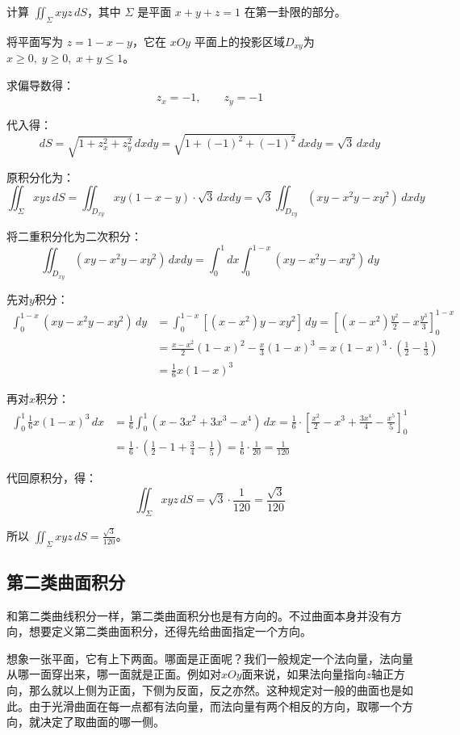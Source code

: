 \begin{myexample}
计算 \(\iint_{\Sigma} xyz \, dS\)，其中 \(\Sigma\) 是平面 \(x+y+z=1\) 在第一卦限的部分。

将平面写为 \(z=1-x-y\)，它在 \(xOy\) 平面上的投影区域\(D_{xy}\)为\(x\ge 0,\;y\ge 0,\;x+y\le 1\)。

求偏导数得：
\[
z_x = -1,\qquad z_y = -1
\]

代入得：
\[
dS = \sqrt{1+z_x^2+z_y^2}\,dxdy
= \sqrt{1+(-1)^2+(-1)^2}\,dxdy
= \sqrt{3}\,dxdy
\]

原积分化为：
\[
\iint_{\Sigma} xyz \, dS
= \iint_{D_{xy}} xy(1-x-y) \cdot \sqrt{3}\,dxdy
= \sqrt{3} \iint_{D_{xy}} (xy - x^2y - xy^2)\,dxdy
\]

将二重积分化为二次积分：
\[
\iint_{D_{xy}} (xy - x^2y - xy^2)\,dxdy
= \int_0^1 dx \int_0^{1-x} (xy - x^2y - xy^2)\,dy
\]

先对\(y\)积分：
\[
\begin{aligned}
    \int_0^{1-x} (xy - x^2y - xy^2)\,dy
    &= \int_0^{1-x} [ (x-x^2)y - xy^2 ]\,dy
    = \left[(x-x^2)\frac{y^2}{2} - x\frac{y^3}{3}\right]_0^{1-x}\\
    &= \frac{x-x^2}{2}(1-x)^2 - \frac{x}{3}(1-x)^3
    = x(1-x)^3\cdot(\frac12 - \frac13)\\
    &= \frac{1}{6}x(1-x)^3
\end{aligned}
\]

再对\(x\)积分：
\[
\begin{aligned}
    \int_0^1 \frac{1}{6}x(1-x)^3\,dx
    &=\frac16\int_0^1 (x - 3x^2 + 3x^3 - x^4)\,dx
    = \frac16 \cdot \left[ \frac{x^2}{2} - x^3 + \frac{3x^4}{4} - \frac{x^5}{5} \right]_0^1\\
    &= \frac16 \cdot(\frac12 - 1 + \frac34 - \frac15)
    = \frac16 \cdot\frac{1}{20}
    = \frac{1}{120}
\end{aligned}
\]

代回原积分，得：
\[
\iint_{\Sigma} xyz \, dS = \sqrt{3} \cdot \frac{1}{120} = \frac{\sqrt{3}}{120}
\]

所以 \(\iint_{\Sigma} xyz \, dS = \frac{\sqrt{3}}{120}\)。
\end{myexample}


\subsection{第二类曲面积分}
和第二类曲线积分一样，第二类曲面积分也是有方向的。不过曲面本身并没有方向，想要定义第二类曲面积分，还得先给曲面指定一个方向。

想象一张平面，它有上下两面。哪面是正面呢？我们一般规定一个法向量，法向量从哪一面穿出来，哪一面就是正面。例如对\(xOy\)面来说，如果法向量指向\(z\)轴正方向，那么就以上侧为正面，下侧为反面，反之亦然。这种规定对一般的曲面也是如此。由于光滑曲面在每一点都有法向量，而法向量有两个相反的方向，取哪一个方向，就决定了取曲面的哪一侧。

